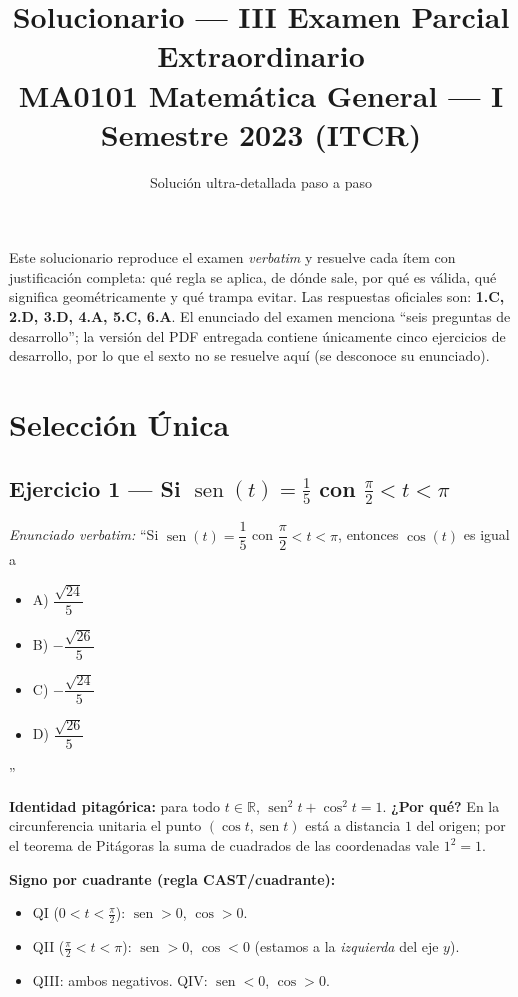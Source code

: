 \documentclass[11pt]{article}
\title{\textbf{Solucionario --- III Examen Parcial Extraordinario}\\[2pt]
\large MA0101 Matemática General --- I Semestre 2023 (ITCR)}
\author{Solución ultra-detallada paso a paso}
\date{}
\DeclareMathOperator{\sen}{sen}
\begin{document}
\maketitle
\tableofcontents
\vspace{1em}

\begin{nota}
Este solucionario reproduce el examen \emph{verbatim} y resuelve cada ítem con justificación completa: qué regla se aplica, de dónde sale, por qué es válida, qué significa geométricamente y qué trampa evitar. Las respuestas oficiales son: \textbf{1.C, 2.D, 3.D, 4.A, 5.C, 6.A}. El enunciado del examen menciona ``seis preguntas de desarrollo''; la versión del PDF entregada contiene únicamente cinco ejercicios de desarrollo, por lo que el sexto no se resuelve aquí (se desconoce su enunciado).
\end{nota}

\section*{Selección Única}

\subsection*{Ejercicio 1 --- Si $\sen(t)=\tfrac{1}{5}$ con $\tfrac{\pi}{2}<t<\pi$}

\textit{Enunciado verbatim:} ``Si $\sen(t)=\dfrac{1}{5}$ con $\dfrac{\pi}{2}<t<\pi$, entonces $\cos(t)$ es igual a
\begin{itemize}[label={},leftmargin=2em,topsep=2pt,itemsep=0pt]
  \item A) $\dfrac{\sqrt{24}}{5}$
  \item B) $-\dfrac{\sqrt{26}}{5}$
  \item C) $-\dfrac{\sqrt{24}}{5}$
  \item D) $\dfrac{\sqrt{26}}{5}$
\end{itemize}''

\begin{teo}
\textbf{Identidad pitagórica:} para todo $t\in\mathbb{R}$, $\sen^2 t+\cos^2 t=1$. \textbf{¿Por qué?} En la circunferencia unitaria el punto $(\cos t,\sen t)$ está a distancia $1$ del origen; por el teorema de Pitágoras la suma de cuadrados de las coordenadas vale $1^2=1$.

\textbf{Signo por cuadrante (regla CAST/cuadrante):}
\begin{itemize}[leftmargin=*]
  \item QI ($0<t<\tfrac{\pi}{2}$): $\sen>0$, $\cos>0$.
  \item QII ($\tfrac{\pi}{2}<t<\pi$): $\sen>0$, $\cos<0$ (estamos a la \emph{izquierda} del eje $y$).
  \item QIII: ambos negativos. \quad QIV: $\sen<0$, $\cos>0$.
\end{itemize}
\end{teo}
\end{document}
